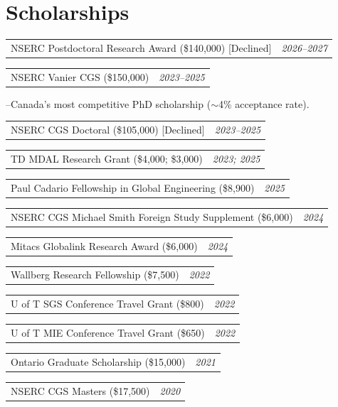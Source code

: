 \documentclass[11pt]{article}
\makeatletter
\newcommand{\cvrow}[2]{%
  \noindent\begin{tabularx}{\textwidth}{@{}X r@{}}
    #1 & \textit{#2}%
  \end{tabularx}\par
}
\newcommand{\award}[1]{\par\hspace{0.5em}\textcolor{agray}{--\enspace#1}}
\makeatother
\begin{document}
\section{Scholarships}

\cvrow{NSERC Postdoctoral Research Award (\$140,000) [Declined]}{2026--2027}

\vspace{3pt}

\cvrow{NSERC Vanier CGS (\$150,000)}{2023--2025}
\award{Canada's most competitive PhD scholarship ($\sim$4\% acceptance rate).}

\vspace{3pt}

\cvrow{NSERC CGS Doctoral (\$105,000) [Declined]}{2023--2025}

\vspace{3pt}

\cvrow{TD MDAL Research Grant (\$4,000; \$3,000)}{2023; 2025}

\vspace{3pt}

\cvrow{Paul Cadario Fellowship in Global Engineering (\$8,900)}{2025}

\vspace{3pt}

\cvrow{NSERC CGS Michael Smith Foreign Study Supplement (\$6,000)}{2024}

\vspace{3pt}

\cvrow{Mitacs Globalink Research Award (\$6,000)}{2024}

\vspace{3pt}

\cvrow{Wallberg Research Fellowship (\$7,500)}{2022}

\vspace{3pt}

\cvrow{U of T SGS Conference Travel Grant (\$800)}{2022}

\vspace{3pt}

\cvrow{U of T MIE Conference Travel Grant (\$650)}{2022}

\vspace{3pt}

\cvrow{Ontario Graduate Scholarship (\$15,000)}{2021}

\vspace{3pt}

\cvrow{NSERC CGS Masters (\$17,500)}{2020}
\end{document}
